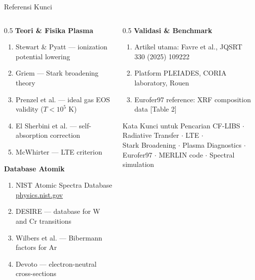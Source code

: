 \documentclass[aspectratio=169, 10pt]{beamer}
\begin{document}
\begin{frame}{Referensi Kunci}
  \begin{columns}[T]
    \begin{column}{0.5\textwidth}
      \textbf{Teori \& Fisika Plasma}
      \begin{enumerate}\scriptsize
        \item Stewart \& Pyatt --- ionization potential lowering
        \item Griem --- Stark broadening theory
        \item Prenzel et al. --- ideal gas EOS validity ($T < 10^5$ K)
        \item El Sherbini et al. --- self-absorption correction
        \item McWhirter --- LTE criterion
      \end{enumerate}
      \vspace{6pt}
      \textbf{Database Atomik}
      \begin{enumerate}\scriptsize
        \setcounter{enumi}{5}
        \item NIST Atomic Spectra Database \url{physics.nist.gov}
        \item DESIRE --- database for W and Cr transitions
        \item Wilbers et al. --- Bibermann factors for Ar
        \item Devoto --- electron-neutral cross-sections
      \end{enumerate}
    \end{column}
    \begin{column}{0.5\textwidth}
      \textbf{Validasi \& Benchmark}
      \begin{enumerate}\scriptsize
        \setcounter{enumi}{9}
        \item Artikel utama: Favre et al., JQSRT 330 (2025) 109222
        \item Platform PLEIADES, CORIA laboratory, Rouen
        \item Eurofer97 reference: XRF composition data [Table 2]
      \end{enumerate}
      \vspace{8pt}
      \begin{alertblock}{Kata Kunci untuk Pencarian}
        \scriptsize
        CF-LIBS $\cdot$ Radiative Transfer $\cdot$ LTE $\cdot$\\
        Stark Broadening $\cdot$ Plasma Diagnostics $\cdot$\\
        Eurofer97 $\cdot$ MERLIN code $\cdot$ Spectral simulation
      \end{alertblock}
    \end{column}
  \end{columns}
\end{frame}
\end{document}
